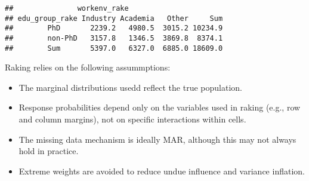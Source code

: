 \documentclass[]{article}
\newenvironment{Shaded}{\begin{snugshade}}{\end{snugshade}}
\newcommand{\AttributeTok}[1]{\textcolor[rgb]{0.13,0.29,0.53}{#1}}
\newcommand{\CommentTok}[1]{\textcolor[rgb]{0.56,0.35,0.01}{\textit{#1}}}
\newcommand{\DecValTok}[1]{\textcolor[rgb]{0.00,0.00,0.81}{#1}}
\newcommand{\FunctionTok}[1]{\textcolor[rgb]{0.13,0.29,0.53}{\textbf{#1}}}
\newcommand{\NormalTok}[1]{#1}
\newcommand{\OtherTok}[1]{\textcolor[rgb]{0.56,0.35,0.01}{#1}}
\newcommand{\SpecialCharTok}[1]{\textcolor[rgb]{0.81,0.36,0.00}{\textbf{#1}}}
\begin{document}
\begin{Shaded}
\end{Shaded}

\begin{verbatim}
##               workenv_rake
## edu_group_rake Industry Academia   Other     Sum
##        PhD       2239.2   4980.5  3015.2 10234.9
##        non-PhD   3157.8   1346.5  3869.8  8374.1
##        Sum       5397.0   6327.0  6885.0 18609.0
\end{verbatim}


Raking relies on the following assummptions:
\begin{itemize}
    \item The marginal distributions usedd reflect the true population.
    \item Response probabilities depend only on the variables used in raking (e.g., row and column margins), not on specific interactions within cells. 
    \item The missing data mechanism is ideally MAR, although this may not always hold in practice. 
    \item Extreme weights are avoided to reduce undue influence and variance inflation. 
\end{itemize}
\end{document}
